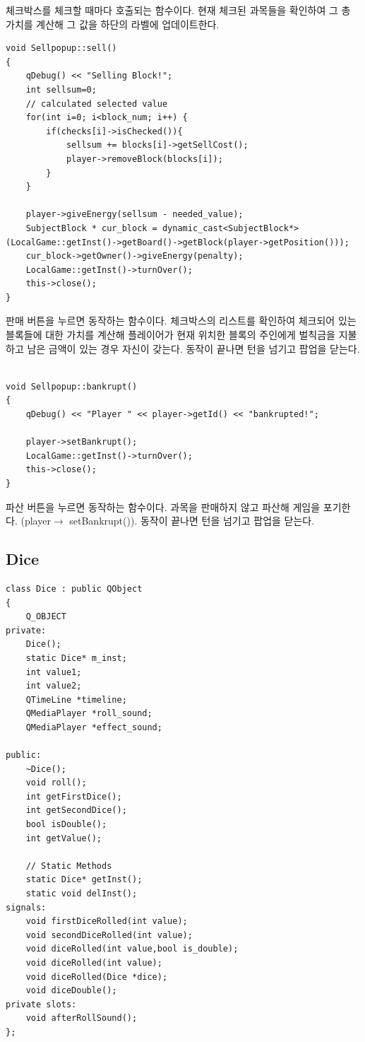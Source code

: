 \documentclass[10pt,oneside,a4paper,titlepage]{article}
\begin{document}
체크박스를 체크할 때마다 호출되는 함수이다. 현재 체크된 과목들을 확인하여 그 총 가치를 계산해 그 값을 하단의 라벨에 업데이트한다.\\

\begin{lstlisting}[frame=single,caption={Sellpopup sell}]
void Sellpopup::sell()
{
    qDebug() << "Selling Block!";
    int sellsum=0;
    // calculated selected value
    for(int i=0; i<block_num; i++) {
        if(checks[i]->isChecked()){
            sellsum += blocks[i]->getSellCost();
            player->removeBlock(blocks[i]);
        }
    }

    player->giveEnergy(sellsum - needed_value);
    SubjectBlock * cur_block = dynamic_cast<SubjectBlock*>(LocalGame::getInst()->getBoard()->getBlock(player->getPosition()));
    cur_block->getOwner()->giveEnergy(penalty);
    LocalGame::getInst()->turnOver();
    this->close();
}

\end{lstlisting}

판매 버튼을 누르면 동작하는 함수이다. 체크박스의 리스트를 확인하여 체크되어 있는 블록들에 대한 가치를 계산해 플레이어가 현재 위치한 블록의 주인에게 벌칙금을 지불하고 남은 금액이 있는 경우 자신이 갖는다. 동작이 끝나면 턴을 넘기고 팝업을 닫는다.\\

\begin{lstlisting}[frame=single,caption={Sellpopup bankrupt}]

void Sellpopup::bankrupt()
{
    qDebug() << "Player " << player->getId() << "bankrupted!";

    player->setBankrupt();
    LocalGame::getInst()->turnOver();
    this->close();
}

\end{lstlisting}

파산 버튼을 누르면 동작하는 함수이다. 과목을 판매하지 않고 파산해 게임을 포기한다. (player$\rightarrow$ setBankrupt()). 동작이 끝나면 턴을 넘기고 팝업을 닫는다. \\


\subsection{Dice}


\begin{lstlisting}[frame=single,caption={Dice header}]
class Dice : public QObject
{
    Q_OBJECT
private:
	Dice();
	static Dice* m_inst;
	int value1;
    int value2;
    QTimeLine *timeline;
    QMediaPlayer *roll_sound;
    QMediaPlayer *effect_sound;

public:
	~Dice();
	void roll();
    int getFirstDice();
    int getSecondDice();
	bool isDouble();
    int getValue();

	// Static Methods
	static Dice* getInst();
	static void delInst();
signals:
    void firstDiceRolled(int value);
    void secondDiceRolled(int value);
    void diceRolled(int value,bool is_double);
    void diceRolled(int value);
    void diceRolled(Dice *dice);
    void diceDouble();
private slots:
    void afterRollSound();
};

\end{lstlisting}
\end{document}
